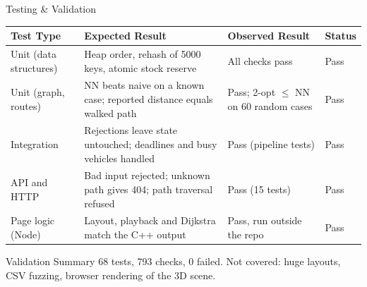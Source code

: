 \documentclass[aspectratio=169,11pt]{beamer}
\begin{document}
\begin{frame}{Testing \& Validation}
\scriptsize
\begin{center}
\renewcommand{\arraystretch}{1.05}
\begin{tabularx}{.96\textwidth}{@{}p{2.0cm}X X p{1.0cm}@{}}
\toprule
Test Type & Expected Result & Observed Result & Status\\
\midrule
Unit (data structures) & Heap order, rehash of 5000 keys, atomic stock reserve & All checks pass & Pass\\
Unit (graph, routes) & NN beats naive on a known case; reported distance equals walked path & Pass; 2-opt $\le$ NN on 60 random cases & Pass\\
Integration & Rejections leave state untouched; deadlines and busy vehicles handled & Pass (pipeline tests) & Pass\\
API and HTTP & Bad input rejected; unknown path gives 404; path traversal refused & Pass (15 tests) & Pass\\
Page logic (Node) & Layout, playback and Dijkstra match the C++ output & Pass, run outside the repo & Pass\\
\bottomrule
\end{tabularx}
\end{center}
\begin{block}{Validation Summary}
68 tests, 793 checks, 0 failed. Not covered: huge layouts, CSV fuzzing, browser rendering of the 3D scene.
\end{block}
\end{frame}
\end{document}
